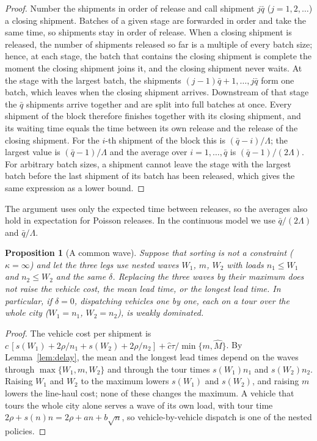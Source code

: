 \documentclass[10pt, reqno]{amsart}
\newtheorem{proposition}{Proposition}
\theoremstyle{definition}
\begin{document}
\begin{proof}
Number the shipments in order of release and call shipment $j\bar q$ ($j=1,2,\dots$) a closing shipment. Batches of a given stage are forwarded in order and take the same time, so shipments stay in order of release. When a closing shipment is released, the number of shipments released so far is a multiple of every batch size; hence, at each stage, the batch that contains the closing shipment is complete the moment the closing shipment joins it, and the closing shipment never waits. At the stage with the largest batch, the shipments $(j-1)\bar q+1,\dots,j\bar q$ form one batch, which leaves when the closing shipment arrives. Downstream of that stage the $\bar q$ shipments arrive together and are split into full batches at once. Every shipment of the block therefore finishes together with its closing shipment, and its waiting time equals the time between its own release and the release of the closing shipment. For the $i$-th shipment of the block this is $(\bar q-i)/\Lambda$; the largest value is $(\bar q-1)/\Lambda$ and the average over $i=1,\dots,\bar q$ is $(\bar q-1)/(2\Lambda)$. For arbitrary batch sizes, a shipment cannot leave the stage with the largest batch before the last shipment of its batch has been released, which gives the same expression as a lower bound.
\end{proof}

The argument uses only the expected time between releases, so the averages also hold in expectation for Poisson releases. In the continuous model we use $\bar q/(2\Lambda)$ and $\bar q/\Lambda$.

\begin{proposition}[A common wave]\label{prop:common}
Suppose that sorting is not a constraint ($\kappa=\infty$) and let the three legs use nested waves $W_1$, $m$, $W_2$ with loads $n_1\le W_1$ and $n_2\le W_2$ and the same $\delta$. Replacing the three waves by their maximum does not raise the vehicle cost, the mean lead time, or the longest lead time. In particular, if $\delta=0$, dispatching vehicles one by one, each on a tour over the whole city ($W_1=n_1$, $W_2=n_2$), is weakly dominated.
\end{proposition}

\begin{proof}
The vehicle cost per shipment is $c\,[s(W_1)+2\rho/n_1+s(W_2)+2\rho/n_2]+\hat c\tau/\min\{m,\hat M\}$. By Lemma~\ref{lem:delay}, the mean and the longest lead times depend on the waves through $\max\{W_1,m,W_2\}$ and through the tour times $s(W_1)n_1$ and $s(W_2)n_2$. Raising $W_1$ and $W_2$ to the maximum lowers $s(W_1)$ and $s(W_2)$, and raising $m$ lowers the line-haul cost; none of these changes the maximum. A vehicle that tours the whole city alone serves a wave of its own load, with tour time $2\rho+s(n)n=2\rho+an+b\sqrt n$, so vehicle-by-vehicle dispatch is one of the nested policies.
\end{proof}
\end{document}
